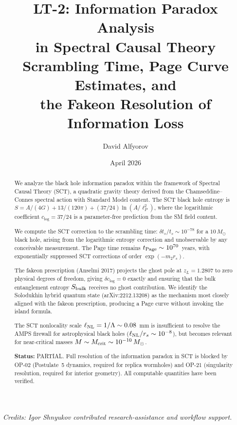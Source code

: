 \documentclass[11pt,a4paper]{article}
\title{LT-2: Information Paradox Analysis\\
in Spectral Causal Theory\\[6pt]
\large Scrambling Time, Page Curve Estimates, and\\
the Fakeon Resolution of Information Loss}
\author{David Alfyorov}
\date{April 2026}
\theoremstyle{plain}
\theoremstyle{definition}
\begin{document}
\maketitle

\begin{center}
\small\textit{Credits: Igor Shnyukov contributed research-assistance and workflow support.}
\end{center}

\begin{abstract}
We analyze the black hole information paradox within the framework of
Spectral Causal Theory (SCT), a quadratic gravity theory derived from
the Chamseddine--Connes spectral action with Standard Model content.
The SCT black hole entropy is $S = A/(4G) + 13/(120\pi) + (37/24)\ln(A/\ell_P^2)$,
where the logarithmic coefficient $c_{\log} = 37/24$ is a parameter-free
prediction from the SM field content.

We compute the SCT correction to the scrambling time:
$\delta t_s / t_s \sim 10^{-78}$ for a $10\,M_\odot$ black hole,
arising from the logarithmic entropy correction and unobservable by
any conceivable measurement.  The Page time remains
$t_{\rm Page} \sim 10^{70}$~years, with exponentially suppressed SCT
corrections of order $\exp(-m_2 r_s)$.

The fakeon prescription (Anselmi 2017) projects the ghost pole at
$z_L = 1.2807$ to zero physical degrees of freedom, giving
$\delta c_{\log} = 0$ exactly and ensuring that the bulk entanglement
entropy $S_{\rm bulk}$ receives no ghost contribution.  We identify
the Solodukhin hybrid quantum state (arXiv:2212.13208) as the mechanism
most closely aligned with the fakeon prescription, producing a Page curve
without invoking the island formula.

The SCT nonlocality scale $\ell_{\rm NL} = 1/\Lambda \sim 0.08$~mm
is insufficient to resolve the AMPS firewall for astrophysical black holes
($\ell_{\rm NL}/r_s \sim 10^{-8}$), but becomes relevant for
near-critical masses $M \sim M_{\rm crit} \sim 10^{-10}\,M_\odot$.

\medskip\noindent
\textbf{Status:} PARTIAL.  Full resolution of the information paradox
in SCT is blocked by OP-02 (Postulate~5 dynamics, required for replica
wormholes) and OP-21 (singularity resolution, required for interior
geometry).  All computable quantities have been verified.
\end{abstract}

\tableofcontents
\end{document}
